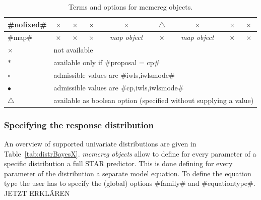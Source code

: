 \begin{table}
\begin{tabular}{|l||c|c|c|c|c|c|c|c|}
\hline
#nofixed#   & $\times$   & $\times$   & $\times$ & $\times$ & $\triangle$ & $\times$ & $\times$ & $\times$\\
\hline
#map#      & $\times$   & $\times$     & $\times$  & {\em map object}  & $\times$  & {\em map object} & $\times$ & $\times$ \\
\hline \hline
$\times$    & \multicolumn{8}{l|}{not available} \\
\hline
$\ast$  & \multicolumn{8}{l|}{available only if #proposal = cp#} \\
\hline
$\circ$  & \multicolumn{8}{l|}{admissible values are #iwls,iwlsmode#} \\
\hline
$\bullet$  & \multicolumn{8}{l|}{admissible values are #cp,iwls,iwlsmode#} \\
\hline
$\triangle$   & \multicolumn{8}{l|}{available as boolean option (specified without supplying a value)} \\
\hline

\end{tabular}
{\em\centering \caption{\label{mcmctermsoptions} Terms and options for mcmcreg objects.}}
\end{table}

\clearpage

\subsubsection{Specifying the response distribution}
 \label{mcmcregfamilysyntax}

An overview of supported univariate distributions are given in Table~\ref{tab:distrBayesX}. {\em mcmcreg objects}
allow to define for every parameter of a specific distribution a full STAR predictor. This is done
defining for every parameter of the distribution a separate model equation. To define the equation
type the user has to specify the (global) options #family# and #equationtype#.
JETZT ERKLÄREN


